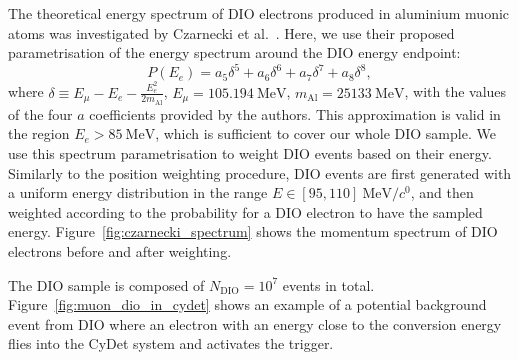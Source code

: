 The theoretical energy spectrum of DIO electrons produced in aluminium muonic
atoms was investigated by Czarnecki et al.~\cite{czarnecki}. Here, we use their
proposed parametrisation of the energy spectrum around the DIO energy endpoint:
\begin{equation}\label{eq:czarnecki_param}
P(E_e) = a_5 \delta^5 + a_6 \delta^6 + a_7 \delta^7 + a_8 \delta^8,
\end{equation}
where $\delta \equiv E_\mu  - E_e - \frac{E_e^2}{2 m_\mathrm{Al}}$, $E_\mu =
\SI{105.194}{\MeV}$, $m_\mathrm{Al} = \SI{25133}{\MeV}$, with the values of the
four $a$ coefficients provided by the authors. This approximation is valid in
the region $E_e > \SI{85}{\MeV}$, which is sufficient to cover our whole DIO
sample. We use this spectrum parametrisation to weight DIO events based on their
energy. Similarly to the position weighting procedure, DIO events are first
generated with a uniform energy distribution in the range $E \in [95,
110]~\si{\MeV/\clight}$, and then weighted according to the probability for a
DIO electron to have the sampled energy. Figure~\ref{fig:czarnecki_spectrum}
shows the momentum spectrum of DIO electrons before and after weighting.

The DIO sample is composed of $N_\mathrm{DIO} = 10^7$ events in total.
Figure~\ref{fig:muon_dio_in_cydet} shows an example of a potential background
event from DIO where an electron with an energy close to the conversion energy
flies into the CyDet system and activates the trigger.

